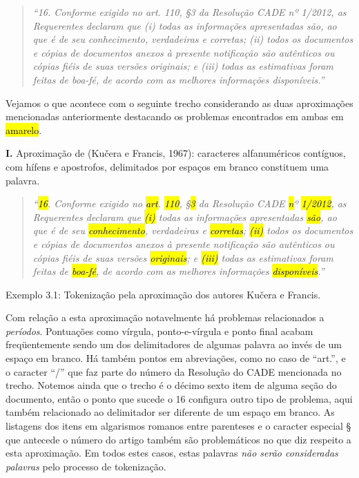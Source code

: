 \documentclass[11pt]{report}
\newcommand{\quotes}[1]{``#1''}
\begin{document}
\begin{quote}
  \textit{\quotes{16. Conforme exigido no art. 110, §3 da Resolução CADE nº 1/2012, as Requerentes declaram que (i) todas as informações apresentadas são, ao que é de seu
  conhecimento, verdadeiras e corretas; (ii) todos os documentos e cópias de documentos anexos à presente notificação são autênticos ou cópias fiéis de suas versões originais;
  e (iii) todas as estimativas foram feitas de boa-fé, de acordo com as melhores informações disponíveis.}}
\end{quote}

Vejamos o que acontece com o seguinte trecho considerando as duas aproximações mencionadas anteriormente destacando os problemas encontrados em ambas em \hl{amarelo}.

\textbf{I.} Aproximação de (Kučera e Francis, 1967): caracteres alfanuméricos contíguos, com hífens e apostrofos, delimitados por espaços em branco constituem uma palavra.

\begin{quote}
  \textit{\quotes{\hl{16}. Conforme exigido no \hl{art}. \hl{110}, §\hl{\mbox{3}} da Resolução CADE \hl{n}º \hl{1/2012}, as Requerentes declaram que \hl{(i)} todas as informações apresentadas \hl{\mbox{são}}, ao que é de seu
  \hl{conhecimento}, verdadeiras e \hl{corretas}; \hl{(ii)} todos os documentos e cópias de documentos anexos à presente notificação são autênticos ou cópias fiéis de suas versões \hl{originais};
  e \hl{(iii)} todas as estimativas foram feitas de \hl{\mbox{boa-fé}}, de acordo com as melhores informações \hl{\mbox{disponíveis}}.}}
\end{quote}
\begin{center}
  Exemplo 3.1: Tokenização pela aproximação dos autores Kučera e Francis.
\end{center}


Com relação a esta aproximação notavelmente há problemas relacionados a \textit{períodos}. Pontuações como vírgula, ponto-e-vírgula e ponto final acabam freqüentemente sendo um dos
delimitadores de algumas palavra ao invés de um espaço em branco. Há também pontos em abreviações, como no caso de \quotes{art.}, e o caracter \quotes{/} que faz parte do número da
Resolução do CADE mencionada no trecho. Notemos ainda que o trecho é o décimo sexto item de alguma seção do documento, então o ponto que sucede o 16 configura outro tipo de problema,
aqui também relacionado ao delimitador ser diferente de um espaço em branco. As listagens dos itens em algarismos romanos entre parenteses e o caracter especial § que antecede o número
do artigo também são problemáticos no que diz respeito a esta aproximação. Em todos estes casos, estas palavras \textit{não serão consideradas palavras} pelo processo de tokenização.\pagebreak
\end{document}
